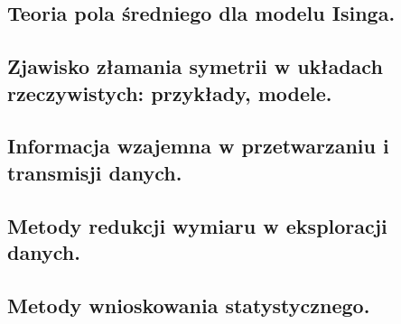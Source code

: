 \documentclass[10pt,a4paper]{article} %
\begin{document}
	\subsection{Teoria pola średniego dla modelu Isinga.}
	
	
	\subsection{Zjawisko złamania symetrii w układach rzeczywistych: przykłady, modele.}
	
	
	\subsection{Informacja wzajemna w przetwarzaniu i transmisji danych.}
	
	
	\subsection{Metody redukcji wymiaru w eksploracji danych.}
	
	
	\subsection{Metody wnioskowania statystycznego.}
	
	
\end{document}
